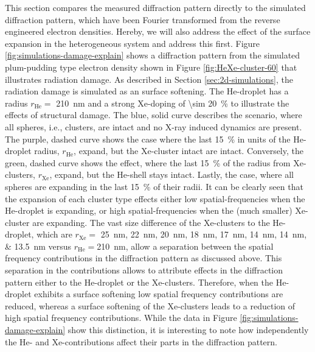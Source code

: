 This section compares the measured diffraction pattern directly to the simulated diffraction pattern, which have been Fourier transformed from the reverse engineered electron densities. Hereby, we will also address the effect of the surface expansion in the heterogeneous system and address this first. Figure \ref{fig:simulations-damage-explain} shows a diffraction pattern from the simulated plum-pudding type electron density shown in Figure \ref{fig:HeXe-cluster-60} that illustrates radiation damage. As described in Section \ref{sec:2d-simulations}, the radiation damage is simulated as an surface softening. The He-droplet has a radius $r_{\text{He}}=$ \SI{210}{\nano\meter} and a strong Xe-doping of \SI{\sim 20}{\percent} to illustrate the effects of structural damage. The blue, solid curve describes the scenario, where all spheres, i.e., clusters, are intact and no X-ray induced dynamics are present. The purple, dashed curve shows the case where the last \SI{15}{\percent} in units of the He-droplet radius, $r_{\text{He}}$, expand, but the Xe-cluster intact are intact. Conversely, the green, dashed curve shows the effect, where the last \SI{15}{\percent} of the radius from Xe-clusters, $r_{\text{Xe}}$, expand, but the He-shell stays intact. Lastly, the case, where all spheres are expanding in the last \SI{15}{\percent} of their radii. It can be clearly seen that the expansion of each cluster type effects either low spatial-frequencies when the He-droplet is expanding, or high spatial-frequencies when the (much smaller) Xe-cluster are expanding. The vast size difference of the Xe-clusters to the He-droplet, which are $r_{\text{Xe}}=$ \SIlist{25;22;20;18;17;14;14;13.5}{\nano\meter} versus $r_{\text{He}}=$\SI{210}{\nano\meter}, allow a separation between the spatial frequency contributions in the diffraction pattern as discussed above. This separation in the contributions allows to attribute effects in the diffraction pattern either to the He-droplet or the Xe-clusters. Therefore, when the He-droplet exhibits a surface softening low spatial frequency contributions are reduced, whereas a surface softening of the Xe-clusters leads to a reduction of high spatial frequency contributions. While the data in Figure \ref{fig:simulations-damage-explain} show this distinction, it is interesting to note how independently the He- and Xe-contributions affect their parts in the diffraction pattern.\\[1\baselineskip]
